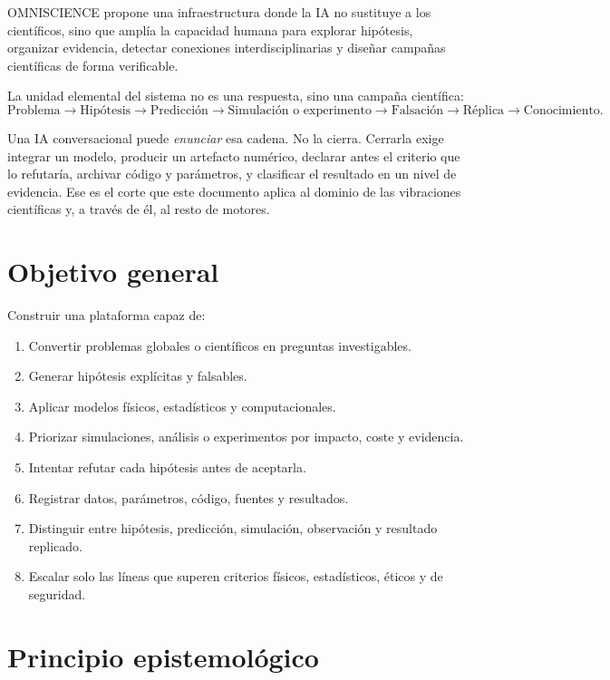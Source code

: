 \documentclass[11pt,a4paper]{article}
\begin{document}
OMNISCIENCE propone una infraestructura donde la IA no sustituye a los científicos, sino que amplía la capacidad humana para explorar hipótesis, organizar evidencia, detectar conexiones interdisciplinarias y diseñar campañas científicas de forma verificable.

La unidad elemental del sistema no es una respuesta, sino una campaña científica:
\begin{equation}
\text{Problema}
\rightarrow
\text{Hipótesis}
\rightarrow
\text{Predicción}
\rightarrow
\text{Simulación o experimento}
\rightarrow
\text{Falsación}
\rightarrow
\text{Réplica}
\rightarrow
\text{Conocimiento}.
\end{equation}

Una IA conversacional puede \emph{enunciar} esa cadena. No la cierra. Cerrarla exige integrar un modelo, producir un artefacto numérico, declarar antes el criterio que lo refutaría, archivar código y parámetros, y clasificar el resultado en un nivel de evidencia. Ese es el corte que este documento aplica al dominio de las vibraciones científicas y, a través de él, al resto de motores.

\section{Objetivo general}

Construir una plataforma capaz de:
\begin{enumerate}[label=\arabic*.]
    \item Convertir problemas globales o científicos en preguntas investigables.
    \item Generar hipótesis explícitas y falsables.
    \item Aplicar modelos físicos, estadísticos y computacionales.
    \item Priorizar simulaciones, análisis o experimentos por impacto, coste y evidencia.
    \item Intentar refutar cada hipótesis antes de aceptarla.
    \item Registrar datos, parámetros, código, fuentes y resultados.
    \item Distinguir entre hipótesis, predicción, simulación, observación y resultado replicado.
    \item Escalar solo las líneas que superen criterios físicos, estadísticos, éticos y de seguridad.
\end{enumerate}

\section{Principio epistemológico}
\end{document}
